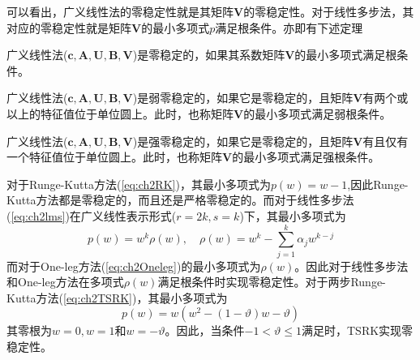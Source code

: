 可以看出，广义线性法的零稳定性就是其矩阵$\bm{V}$的零稳定性。对于线性多步法，其对应的零稳定性就是矩阵$\bm{V}$的最小多项式$p$满足根条件。亦即有下述定理
\begin{theorem}[零稳定性的等价转述]
广义线性法($\bm{c},\bm{A},\bm{U},\bm{B},\bm{V}$)是零稳定的\cite{Jackiewicz2009}，如果其系数矩阵$\bm{V}$的最小多项式满足根条件。
\end{theorem}
\begin{definition}[弱零稳定性]
广义线性法($\bm{c},\bm{A},\bm{U},\bm{B},\bm{V}$)是弱零稳定的\cite{Gear1971a}，如果它是零稳定的，且矩阵$\bm{V}$有两个或以上的特征值位于单位圆上。此时，也称矩阵$\bm{V}$的最小多项式满足弱根条件。
\end{definition}
\begin{definition}[强零稳定性]
广义线性法($\bm{c},\bm{A},\bm{U},\bm{B},\bm{V}$)是强零稳定的\cite{Jackiewicz2009,李寿佛2010,Gear1971a}，如果它是零稳定的，且矩阵$\bm{V}$有且仅有一个特征值位于单位圆上。此时，也称矩阵$\bm{V}$的最小多项式满足强根条件。
\end{definition}%

对于Runge-Kutta方法(\ref{eq:ch2RK})，其最小多项式为$p(w)=w-1$,因此Runge-Kutta方法都是零稳定的，而且还是严格零稳定的。而对于线性多步法(\ref{eq:ch2lms})在广义线性表示形式($r=2k,s=k$)下，其最小多项式为
\begin{equation}
p(w)=w^k\rho(w),\quad \rho(w)=w^k-\sum_{j=1}^{k}\alpha_jw^{k-j}
\end{equation}
而对于One-leg方法(\ref{eq:ch2Oneleg})的最小多项式为$\rho(w)$。因此对于线性多步法和One-leg方法在多项式$\rho(w)$满足根条件时实现零稳定性。对于两步Runge-Kutta方法(\ref{eq:ch2TSRK})，其最小多项式为
\begin{equation}
p(w)=w(w^2-(1-\vartheta)w-\vartheta)
\end{equation}
其零根为$w=0,w=1$和$w=-\vartheta$。因此，当条件$-1<\vartheta\le1$满足时，TSRK实现零稳定性。

